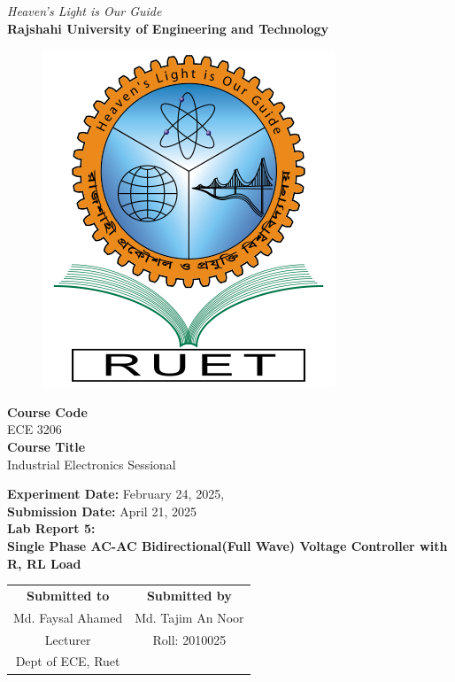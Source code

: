 \vspace*{\fill}
\begin{center}

    \emph{Heaven's Light is Our Guide} \\
    \textbf{Rajshahi University of Engineering and Technology} \\

    \begin{figure}[H]
        \centering
        \includegraphics[scale=.34]{images/RUET_logo.png}
        \label{fig:ruet_logo}
    \end{figure}
    \vspace{5mm}

    \textbf{Course Code}\\
    ECE 3206\\
    \vspace{3mm}
    \textbf{Course Title}\\
    Industrial Electronics Sessional

    \vspace{5mm}
    \textbf{Experiment Date:} {February 24, 2025},\\
    \textbf{Submission Date:} {April 21, 2025}\\

    \vspace{5mm}
    \textbf{Lab Report 5: \\
        Single Phase AC-AC Bidirectional(Full Wave) Voltage Controller with R, RL Load}

    \vspace{15mm}

    \begin{tabular}{c|c}
        \textbf{Submitted to} & \textbf{Submitted by} \\
        Md. Faysal Ahamed     & Md. Tajim An Noor     \\
        Lecturer              & Roll: 2010025         \\
        Dept of ECE, Ruet     &                       \\
    \end{tabular}

\end{center}
\vspace*{\fill}
